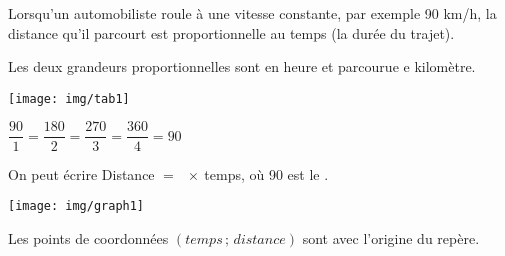 
\begin{myex}

Lorsqu'un automobiliste roule à une vitesse constante, par exemple 90 km/h, la distance qu'il parcourt est proportionnelle au temps (la durée du trajet).

Les deux grandeurs proportionnelles sont  en heure et  parcourue e kilomètre.

\begin{multicols}{2}
	\texttt{[image: img/tab1]}
	
	
	{\center $\dfrac{90}{1}=\dfrac{180}{2}=\dfrac{270}{3}=\dfrac{360}{4}=90$}
\end{multicols}	
	
	On peut écrire Distance $=$ $ \: \times \:$temps, où 90 est le .
	
	\mysp
	
	\begin{center}
		\texttt{[image: img/graph1]}
	\end{center}
	
	Les points de coordonnées $(temps\, ;\, distance)$ sont  avec l'origine du repère.
\end{myex}